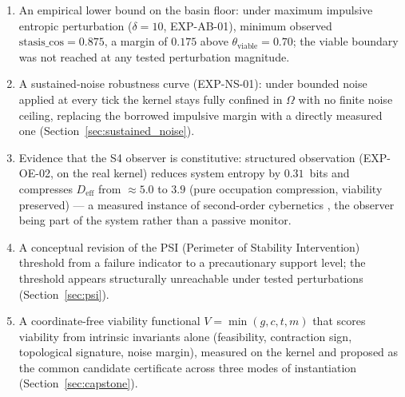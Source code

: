 \documentclass[11pt, a4paper]{article}
\begin{document}
\begin{enumerate}
        Section~\ref{sec:closure}): all five systems S1--S5 shown causally active in a
        single run --- S3 attempting control and overruled by S5, S4 producing a
        governance decision, S5 monitoring covenant invariants --- complemented by a
        direct test of the S5 constitutional veto (EXP-S5-01, halt and Merkle-chained
        resume of S3 autonomy) and a measurement of the limit of the S4 anticipatory
        channel (EXP-S4-02): because the attractor holds $\text{stasis\_cos}$
        invariant against CPU load, internal self-correlation carries no early warning,
        so anticipation requires environment signals independent of the regulated
        state.
  \item An empirical lower bound on the basin floor: under maximum impulsive
        entropic perturbation ($\delta=10$, EXP-AB-01), minimum observed
        $\text{stasis\_cos} = 0.875$, a margin of $0.175$ above
        $\theta_\text{viable}=0.70$; the viable boundary was not reached
        at any tested perturbation magnitude.
  \item A sustained-noise robustness curve (EXP-NS-01): under bounded noise
        applied at every tick the kernel stays fully confined in $\Omega$ with no
        finite noise ceiling, replacing the borrowed impulsive margin with a
        directly measured one (Section~\ref{sec:sustained_noise}).
  \item Evidence that the S4 observer is constitutive: structured observation
        (EXP-OE-02, on the real kernel) reduces system entropy by $0.31$~bits and
        compresses $D_\text{eff}$ from $\approx5.0$ to $3.9$ (pure occupation
        compression, viability preserved) --- a measured instance of second-order
        cybernetics \citep{vonfoerster1974cybernetics}, the observer being part of
        the system rather than a passive monitor.
  \item A conceptual revision of the PSI (Perimeter of Stability
        Intervention) threshold from a failure indicator to a
        precautionary support level; the threshold appears structurally
        unreachable under tested perturbations (Section~\ref{sec:psi}).
  \item A coordinate-free viability functional $V = \min(g,c,t,m)$ that scores
        viability from intrinsic invariants alone (feasibility, contraction sign,
        topological signature, noise margin), measured on the kernel and proposed
        as the common candidate certificate across three modes of instantiation
        (Section~\ref{sec:capstone}).
\end{enumerate}
\end{document}
